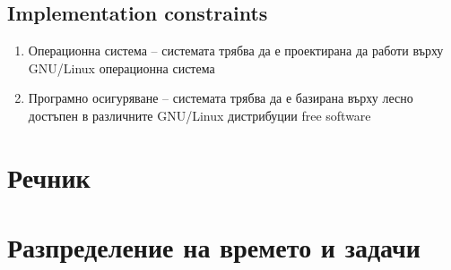 \documentclass[]{article}
\begin{document}
\subsection{Implementation constraints}
\begin{enumerate}
\item Операционна система -- системата трябва да е проектирана да работи върху GNU/Linux операционна система
\item Програмно осигуряване -- системата трябва да е базирана върху лесно достъпен в различните GNU/Linux дистрибуции free software
\end{enumerate}


\section*{Речник} %

\section*{Разпределение на времето и задачи} %
\setcounter{table}{0}
\end{document}
